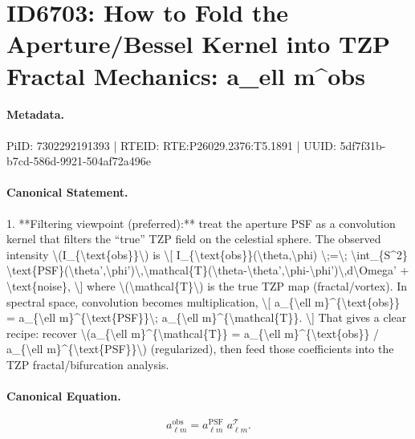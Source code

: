 \section*{ID6703: How to Fold the Aperture/Bessel Kernel into TZP Fractal Mechanics: a\_ell m\textasciicircum{}obs}
\paragraph{Metadata.}
PiID: 7302292191393 | RTEID: RTE:P26029.2376:T5.1891 | UUID: 5df7f31b-b7cd-586d-9921-504af72a496e

\paragraph{Canonical Statement.}
1. **Filtering viewpoint (preferred):** treat the aperture PSF as a convolution kernel that filters the “true” TZP field on the celestial sphere. The observed intensity \textbackslash{}(I\_\{\textbackslash{}text\{obs\}\}\textbackslash{}) is \textbackslash{}[ I\_\{\textbackslash{}text\{obs\}\}(\textbackslash{}theta,\textbackslash{}phi) \textbackslash{};=\textbackslash{}; \textbackslash{}int\_\{S\textasciicircum{}2\} \textbackslash{}text\{PSF\}(\textbackslash{}theta',\textbackslash{}phi')\textbackslash{},\textbackslash{}mathcal\{T\}(\textbackslash{}theta-\textbackslash{}theta',\textbackslash{}phi-\textbackslash{}phi')\textbackslash{},d\textbackslash{}Omega' + \textbackslash{}text\{noise\}, \textbackslash{}] where \textbackslash{}(\textbackslash{}mathcal\{T\}\textbackslash{}) is the true TZP map (fractal/vortex). In spectral space, convolution becomes multiplication, \textbackslash{}[ a\_\{\textbackslash{}ell m\}\textasciicircum{}\{\textbackslash{}text\{obs\}\} = a\_\{\textbackslash{}ell m\}\textasciicircum{}\{\textbackslash{}text\{PSF\}\}\textbackslash{}; a\_\{\textbackslash{}ell m\}\textasciicircum{}\{\textbackslash{}mathcal\{T\}\}. \textbackslash{}] That gives a clear recipe: recover \textbackslash{}(a\_\{\textbackslash{}ell m\}\textasciicircum{}\{\textbackslash{}mathcal\{T\}\} = a\_\{\textbackslash{}ell m\}\textasciicircum{}\{\textbackslash{}text\{obs\}\} / a\_\{\textbackslash{}ell m\}\textasciicircum{}\{\textbackslash{}text\{PSF\}\}\textbackslash{}) (regularized), then feed those coefficients into the TZP fractal/bifurcation analysis.

\paragraph{Canonical Equation.}
\[
a_{\ell m}^{\text{obs}} = a_{\ell m}^{\text{PSF}}\; a_{\ell m}^{\mathcal{T}}.
\]


